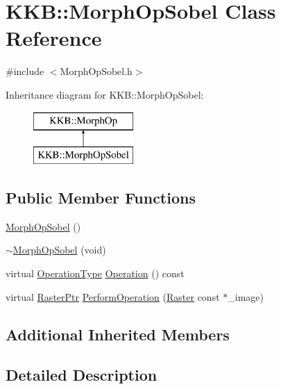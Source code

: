 \hypertarget{class_k_k_b_1_1_morph_op_sobel}{}\section{K\+KB\+:\+:Morph\+Op\+Sobel Class Reference}
\label{class_k_k_b_1_1_morph_op_sobel}


{\ttfamily \#include $<$Morph\+Op\+Sobel.\+h$>$}

Inheritance diagram for K\+KB\+:\+:Morph\+Op\+Sobel\+:\begin{figure}[H]
\begin{center}
\leavevmode
\includegraphics[height=2.000000cm]{class_k_k_b_1_1_morph_op_sobel}
\end{center}
\end{figure}
\subsection*{Public Member Functions}
\begin{DoxyCompactItemize}
\item 
\hyperlink{class_k_k_b_1_1_morph_op_sobel_a675a53713bf9f9c1d37caa917e14d051}{Morph\+Op\+Sobel} ()
\item 
\hyperlink{class_k_k_b_1_1_morph_op_sobel_a93d249ab7be5efa900efa9d87a740fd3}{$\sim$\+Morph\+Op\+Sobel} (void)
\item 
virtual \hyperlink{class_k_k_b_1_1_morph_op_a32070d9c14d16849873a8a409f5b0d69}{Operation\+Type} \hyperlink{class_k_k_b_1_1_morph_op_sobel_a0c11ea47d46bbe8c365db296672f0595}{Operation} () const 
\item 
virtual \hyperlink{namespace_k_k_b_a80d46bd24db644a022c863bce8ae3633}{Raster\+Ptr} \hyperlink{class_k_k_b_1_1_morph_op_sobel_a0e58b3ecae29af573c719b8d79c8dbd4}{Perform\+Operation} (\hyperlink{class_k_k_b_1_1_raster}{Raster} const $\ast$\+\_\+image)
\end{DoxyCompactItemize}
\subsection*{Additional Inherited Members}


\subsection{Detailed Description}


